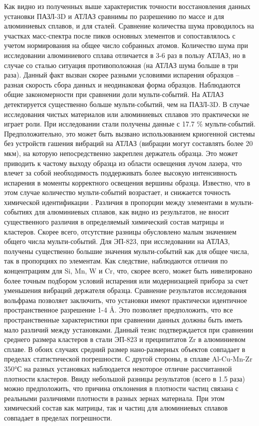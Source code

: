 Как видно из полученных выше характеристик точности восстановления данных установки ПАЗЛ-3D и АТЛАЗ сравнимы по разрешению по массе и для алюминиевых сплавов, и для сталей. Сравнение количества шума проводилось на участках масс-спектра после пиков основных элементов и сопоставлялось с учетом нормирования на общее число собранных атомов. Количество шума при исследовании алюминиевого сплава отличается в 3-6 раз в пользу АТЛАЗ, но в случае со сталью ситуация противоположная (на АТЛАЗ шума больше в три раза). Данный факт вызван скорее разными условиями испарения образцов – разная скорость сбора данных и неодинаковая форма образцов. Наблюдаются общие закономерности при сравнении доли мульти-событий. На АТЛАЗ детектируется существенно больше мульти-событий, чем на ПАЗЛ-3D. В случае исследования чистых материалов или алюминиевых сплавов это практически не играет роли. При исследовании стали получены данные с 17.7 \% мульти-событий. Предположительно, это может быть вызвано использованием криогенной системы без устройств гашения вибраций на АТЛАЗ (вибрации могут составлять более 20 мкм), на которую непосредственно закреплен держатель образца. Это может приводить к частому выходу образца из области освещения лучом лазера, что влечет за собой необходимость поддерживать более высокую интенсивность испарения в моменты корректного освещения вершины образца. Известно, что в этом случае количество мульти-событий возрастает, и снижается точность химической идентификации \cite{scbibOptParamsYAFI}. Различия в пропорции между элементами в мульти-событиях для алюминиевых сплавов, как видно из результатов, не вносит существенного различия в определяемый химический состав матрицы и кластеров. Скорее всего, отсутствие разницы обусловлено малым значением общего числа мульти-событий. Для ЭП-823, при исследовании на АТЛАЗ, получены существенно большие значения мульти-событий как для общее числа, так в пропорциях по элементам. Как следствие, наблюдаются отличия по концентрациям для Si, Mn, W и Cr, что, скорее всего, может быть нивелировано более точным подбором условий испарения или модернизацией прибора за счет уменьшения вибраций держателя образца.
Сравнение результатов исследования вольфрама позволяет заключить, что установки имеют практически идентичное пространственное разрешение 1-4 \r{A}. Это позволяет предположить, что все пространственные характеристики при сравнении данных должны быть иметь мало различий между установками. Данный тезис подтверждается при сравнении среднего размера кластеров в стали ЭП-823 и преципитатов Zr в алюминиевом сплаве. В обоих случаях средний размер нано-размерных объектов совпадает в пределах статистической погрешности. С другой стороны, в сплаве Al-Cu-Mn-Zr 350°С на разных установках наблюдается некоторое отличие рассчитанной плотности кластеров. Ввиду небольшой разницы результатов (всего в 1.5 раза) можно предположить, что причина отклонения в плотности частиц связана с реальными различиями плотности в разных зернах материала. При этом химический состав как матрицы, так и частиц для алюминиевых сплавов совпадает в пределах погрешности.


